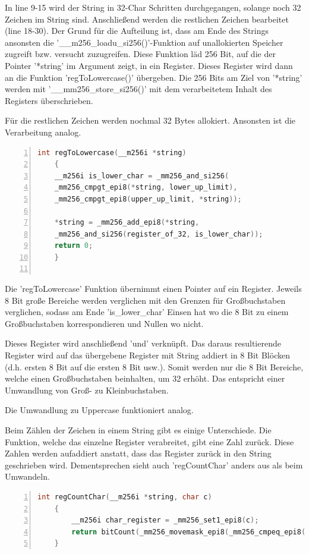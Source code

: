 \documentclass[plainarticle,zihtitle,german,final,hyperref,utf8]{zihpub}
\begin{document}
In line 9-15 wird der String in 32-Char Schritten durchgegangen, solange noch 32 Zeichen im String sind.
Anschließend werden die restlichen Zeichen bearbeitet (line 18-30). Der Grund für die Aufteilung ist, dass am Ende des Strings ansonsten die '\_\_m256\_loadu\_si256()'-Funktion auf unallokierten Speicher zugreift bzw. versucht zuzugreifen. Diese Funktion läd 256 Bit, auf die der Pointer '{*}string' im Argument zeigt, in ein Register.
Dieses Register wird dann an die Funktion 'regToLowercase()' übergeben. Die 256 Bits am Ziel von '{*}string' werden mit '\_\_mm256\_store\_si256()' mit dem verarbeitetem Inhalt des Registers überschrieben.

Für die restlichen Zeichen werden nochmal 32 Bytes allokiert. Ansonsten ist die Verarbeitung analog.

\begin{lstlisting}[language=c, numbers=left]
	int regToLowercase(__m256i *string)
	{
	__m256i is_lower_char = _mm256_and_si256(
	_mm256_cmpgt_epi8(*string, lower_up_limit),
	_mm256_cmpgt_epi8(upper_up_limit, *string));

	*string = _mm256_add_epi8(*string,
	_mm256_and_si256(register_of_32, is_lower_char));
	return 0;
	}
	
\end{lstlisting}

Die 'regToLowercase' Funktion übernimmt einen Pointer auf ein Register. Jeweils 8 Bit große Bereiche werden verglichen mit den Grenzen für Großbuchstaben verglichen, sodass am Ende 'is\_lower\_char' Einsen hat wo die 8 Bit zu einem Großbuchstaben korrespondieren und Nullen wo nicht.

Dieses Register wird anschließend 'und' verknüpft. Das daraus resultierende Register wird auf das übergebene Register mit String addiert in 8 Bit Blöcken (d.h. ersten 8 Bit auf die ersten 8 Bit usw.). Somit werden nur die 8 Bit Bereiche, welche einen Großbuchstaben beinhalten, um 32 erhöht. Das entspricht einer Umwandlung von Groß- zu Kleinbuchstaben.

Die Umwandlung zu Uppercase funktioniert analog.


Beim Zählen der Zeichen in einem String gibt es einige Unterschiede. Die Funktion, welche das einzelne Register verabreitet, gibt eine Zahl zurück. Diese Zahlen werden aufaddiert anstatt, dass das Register zurück in den String geschrieben wird.
Dementsprechen sieht auch 'regCountChar' anders aus als beim Umwandeln. 

\begin{lstlisting}[language=c, numbers=left]
	int regCountChar(__m256i *string, char c)
	{
		__m256i char_register = _mm256_set1_epi8(c);
		return bitCount(_mm256_movemask_epi8(_mm256_cmpeq_epi8(*string, char_register)));
	}
\end{lstlisting}
\end{document}
